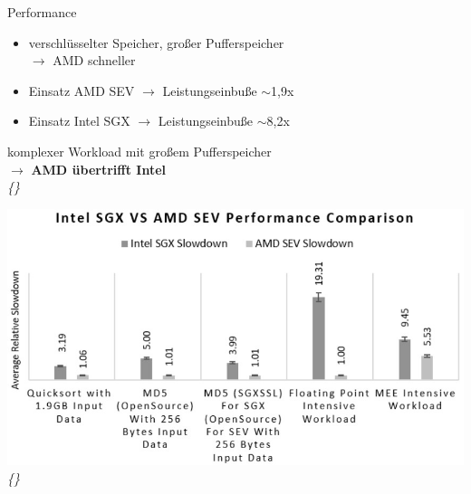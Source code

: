 \documentclass{sdqbeamer}
\begin{document}
\begin{frame}{Performance}
	\begin{minipage}{0.49\linewidth}
		\begin{itemize}
			\item verschlüsselter Speicher, großer Pufferspeicher \\ \(\rightarrow\) AMD schneller
			\item Einsatz AMD SEV \(\rightarrow\) Leistungseinbuße \begin{math} \sim \end{math}1,9x
			\item Einsatz Intel SGX  \(\rightarrow\) Leistungseinbuße \begin{math} \sim \end{math}8,2x
		\end{itemize}
		\vfill
		\color{kitgreen}
		{komplexer Workload mit großem Pufferspeicher\\ \(\rightarrow\) \textbf{AMD übertrifft Intel}}
		\color{black}\\
		\vspace{3ex}
		\vfill
		\small\textit{\{\cite{mofrad}\}}
	\end{minipage}
	\begin{minipage}{0.5\linewidth}
		\begin{center}
			\includegraphics[width=\linewidth]{Bilder/performance.jpg} \\
			\small\textit{\{\cite{mofrad}\}}
		\end{center}
	\end{minipage}
\end{frame}
\end{document}
